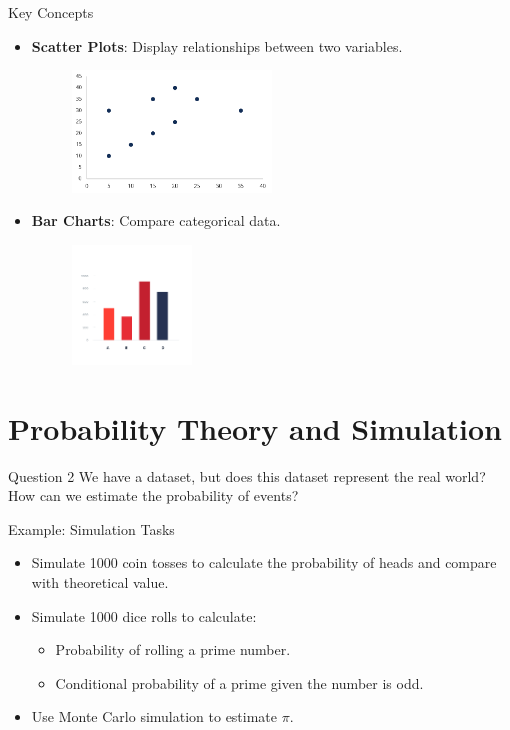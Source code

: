 \documentclass{beamer}
\begin{document}
\begin{frame}{Key Concepts}
\begin{itemize}
    \item \textbf{Scatter Plots}: Display relationships between two variables.
    \begin{figure}
        \centering
        \includegraphics[width=0.5\textwidth]{imgs/scatter-plot.png}
    \end{figure}
    \item \textbf{Bar Charts}: Compare categorical data.
    \begin{figure}
        \centering
        \includegraphics[width=0.3\textwidth]{imgs/bar-chart.png}
    \end{figure}
\end{itemize}
\end{frame}


\section{Probability Theory and Simulation}

\begin{frame}{Question 2}
    We have a dataset, but does this dataset represent the real world? How can we estimate the probability of events?
\end{frame}


\begin{frame}{Example: Simulation Tasks}
    \begin{itemize}
        \item Simulate 1000 coin tosses to calculate the probability of heads and compare with theoretical value.
        \item Simulate 1000 dice rolls to calculate:
        \begin{itemize}
            \item Probability of rolling a prime number.
            \item Conditional probability of a prime given the number is odd.
        \end{itemize}
        \item Use Monte Carlo simulation to estimate $\pi$.
    \end{itemize}
    \end{frame}
\end{document}
